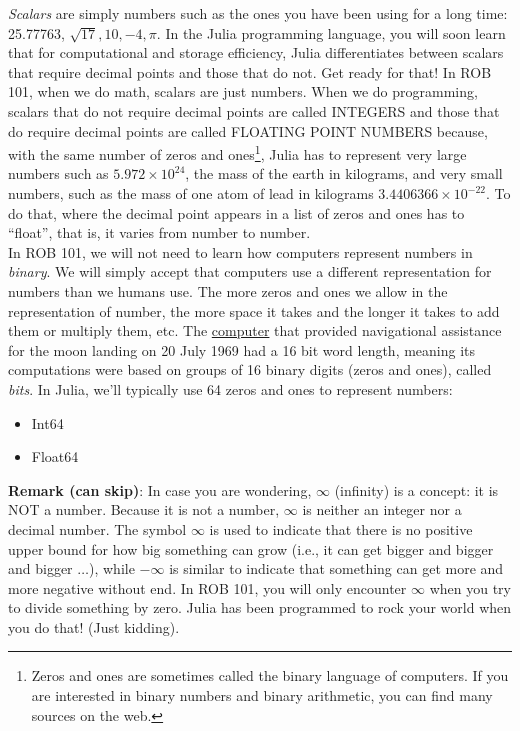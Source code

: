 \textit{Scalars} are simply numbers such as the ones you have been using for a long time: 25.77763, $\sqrt{17}, 10, -4, \pi$. In the Julia programming language, you will soon learn that for computational and storage efficiency, Julia differentiates between scalars that require decimal points and those that do not. Get ready for that! In ROB 101, when we do math, scalars are just numbers. When we do programming, scalars that do not require decimal points are called INTEGERS and those that do require decimal points are called FLOATING POINT NUMBERS because, with the same number of zeros and ones\footnote{Zeros and ones are sometimes called the binary language of computers. If you are interested in binary numbers and binary arithmetic, you can find many sources on the web.}, Julia has to represent very large numbers such as $5.972 \times 10^{24}$, the mass of the earth in kilograms, and very small numbers, such as the mass of one atom of lead in kilograms $3.4406366 \times 10^{-22}$. To do that, where the decimal point appears in a list of zeros and ones has to ``float'', that is, it varies from number to number.\\


In ROB 101, we will not need to learn how computers represent numbers in \textit{binary}. We will simply accept that computers use a different representation for numbers than we humans use. The more zeros and ones we allow in the representation of number, the more space it takes and the longer it takes to add them or multiply them, etc. The \href{https://en.wikipedia.org/wiki/Apollo_Guidance_Computer}{computer} that  provided navigational assistance for the moon landing on 20 July 1969 had a 16 bit word length, meaning its computations were based on groups of 16 binary digits (zeros and ones), called \textit{bits}. In Julia, we'll typically use 64 zeros and ones to represent numbers: 
\begin{itemize}
    \item Int64
    \item Float64
\end{itemize}

\textbf{Remark (can skip)}: In case you are wondering, $\infty$ (infinity) is a concept: it is NOT a number. Because it is not a number, $\infty$ is neither an integer nor a decimal number. The symbol $\infty$ is used to indicate that there is no positive upper bound for how big something can grow (i.e., it can get bigger and bigger and bigger $\ldots$), while $-\infty$ is similar to indicate that something can get more and more negative without end. In ROB 101, you will only encounter $\infty$ when you try to divide something by zero. Julia has been programmed to rock your world when you do that! (Just kidding).

